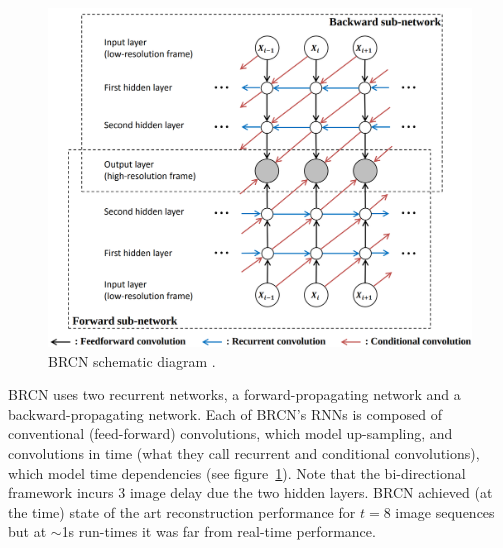 \begin{figure}
    \includegraphics[width=.49\textwidth]{figures/neural_networks/brcn.png}
    \caption{BRCN schematic diagram \cite{huang2015bidirectional}.}\label{subfig:brcn}
\end{figure}
BRCN uses two recurrent networks, a forward-propagating network and a backward-propagating network.
%
Each of BRCN's RNNs is composed of conventional (feed-forward) convolutions, which model up-sampling, and convolutions in time (what they call recurrent and conditional convolutions), which model time dependencies (see figure~\ref{subfig:brcn}).
%
Note that the bi-directional framework incurs 3 image delay due the two hidden layers.
%
BRCN achieved (at the time) state of the art reconstruction performance for \(t=8\) image sequences but at \(\sim\)1s run-times it was far from real-time performance.
